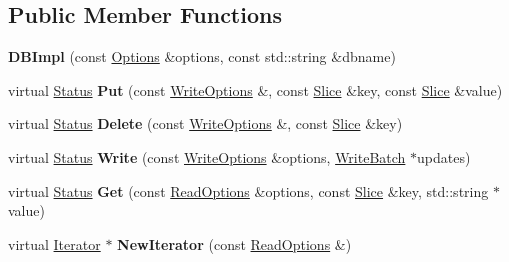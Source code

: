 \subsection*{Public Member Functions}
\begin{DoxyCompactItemize}
\item 
\mbox{\label{classleveldb_1_1_d_b_impl_a269b55605b27271d6ca5fee68af0d8f3}} 
{\bfseries D\+B\+Impl} (const \mbox{\hyperlink{structleveldb_1_1_options}{Options}} \&options, const std\+::string \&dbname)
\item 
\mbox{\label{classleveldb_1_1_d_b_impl_ad0d56aeb4d84ff9632c9a7f3f1b7c4d5}} 
virtual \mbox{\hyperlink{classleveldb_1_1_status}{Status}} {\bfseries Put} (const \mbox{\hyperlink{structleveldb_1_1_write_options}{Write\+Options}} \&, const \mbox{\hyperlink{classleveldb_1_1_slice}{Slice}} \&key, const \mbox{\hyperlink{classleveldb_1_1_slice}{Slice}} \&value)
\item 
\mbox{\label{classleveldb_1_1_d_b_impl_af050f77e8c22bd6638fed5a46a59399d}} 
virtual \mbox{\hyperlink{classleveldb_1_1_status}{Status}} {\bfseries Delete} (const \mbox{\hyperlink{structleveldb_1_1_write_options}{Write\+Options}} \&, const \mbox{\hyperlink{classleveldb_1_1_slice}{Slice}} \&key)
\item 
\mbox{\label{classleveldb_1_1_d_b_impl_ac0d0b472717099d6a02ad9dace4e8ef4}} 
virtual \mbox{\hyperlink{classleveldb_1_1_status}{Status}} {\bfseries Write} (const \mbox{\hyperlink{structleveldb_1_1_write_options}{Write\+Options}} \&options, \mbox{\hyperlink{classleveldb_1_1_write_batch}{Write\+Batch}} $\ast$updates)
\item 
\mbox{\label{classleveldb_1_1_d_b_impl_a089964ddcd1f5dc85e73499ae57be508}} 
virtual \mbox{\hyperlink{classleveldb_1_1_status}{Status}} {\bfseries Get} (const \mbox{\hyperlink{structleveldb_1_1_read_options}{Read\+Options}} \&options, const \mbox{\hyperlink{classleveldb_1_1_slice}{Slice}} \&key, std\+::string $\ast$value)
\item 
\mbox{\label{classleveldb_1_1_d_b_impl_ae955dc8f2a1c38588723a0882653cb58}} 
virtual \mbox{\hyperlink{classleveldb_1_1_iterator}{Iterator}} $\ast$ {\bfseries New\+Iterator} (const \mbox{\hyperlink{structleveldb_1_1_read_options}{Read\+Options}} \&)

\end{DoxyCompactItemize}
